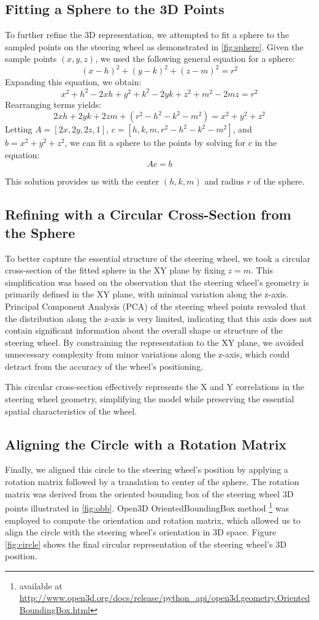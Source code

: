 \subsection{Fitting a Sphere to the 3D Points}
To further refine the 3D representation, we attempted to fit a sphere 
to the sampled points on the steering wheel as demonstrated in
\cref{fig:sphere}. 
Given the sample points \((x, y, z)\), we used the following general 
equation for a sphere:
\[
(x - h)^2 + (y - k)^2 + (z - m)^2 = r^2
\]
Expanding this equation, we obtain:
\[
x^2 + h^2 - 2xh + y^2 + k^2 - 2yk + z^2 + m^2 - 2mz = r^2
\]
Rearranging terms yields:
\[
2xh + 2yk + 2zm + (r^2 - h^2 - k^2 - m^2) = x^2 + y^2 + z^2
\]
Letting \( A = [2x, 2y, 2z, 1] \), \( c = [h, k, m, r^2 - h^2 - k^2 - m^2] \), and 
\( b = x^2 + y^2 + z^2 \), we can fit a sphere to the points by solving 
for \( c \) in the equation:
\[
Ac = b
\]

This solution provides us with the center \((h, k, m)\) and radius 
\(r\) of the sphere.


\subsection{Refining with a Circular Cross-Section from the Sphere}
To better capture the essential structure of the steering wheel, 
we took a circular cross-section of the fitted sphere in the XY plane 
by fixing \( z = m \). This simplification was based on the observation 
that the steering wheel’s geometry is primarily defined in the XY plane, 
with minimal variation along the z-axis. 
Principal Component Analysis (PCA) of the steering wheel points 
revealed that the distribution along the z-axis is very limited, 
indicating that this axis does not contain significant information 
about the overall shape or structure of the steering wheel. 
By constraining the representation to the XY plane, 
we avoided unnecessary complexity from minor variations along 
the z-axis, which could detract from the accuracy of the wheel’s 
positioning.

This circular cross-section effectively represents the X and Y 
correlations in the steering wheel geometry, 
simplifying the model while preserving the essential spatial 
characteristics of the wheel.


\subsection{Aligning the Circle with a Rotation Matrix}
Finally, we aligned this circle to the steering wheel’s position 
by applying a rotation matrix followed by a translation 
to center of the sphere. The rotation matrix was derived 
from the oriented bounding box of the steering wheel 3D points 
illustrated in \cref{fig:obb}. Open3D OrientedBoundingBox method 
\footnote{available at \url{http://www.open3d.org/docs/release/python_api/open3d.geometry.OrientedBoundingBox.html}}
was employed to compute the orientation and rotation matrix, 
which allowed us to align the circle with the steering 
wheel’s orientation in 3D space. 
Figure \cref{fig:circle} shows the final circular representation of the steering wheel's 3D position.

